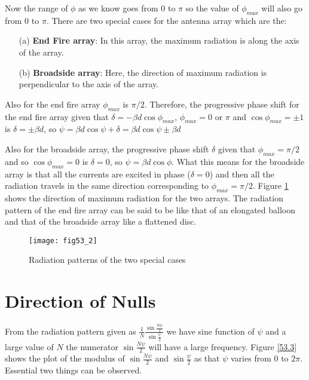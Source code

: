 Now the range of $\phi$ as we know goes from $0$ to $\pi$ so the value of $\phi_{max}$ will also go from $0$ to $\pi$.
There are two special cases for the antenna array which are the:
\begin{enumerate}
	\item [(a)] \textbf{End Fire array}: In this array, the maximum radiation is along the axis of the array. 
	\item[(b)] \textbf{Broadside array}: Here, the direction of maximum radiation is perpendicular to the axis of the array.
\end{enumerate}

Also for the end fire array $\phi_{max}$ is $\pi/2$. Therefore, the progressive phase shift for the end fire array given that $\delta = -\beta d\cos{\phi_{max}}$, $\phi_{max}=0$ or $\pi$ and $\cos{\phi_{max}} = \pm 1$ is $\delta = \pm \beta d$, so $\psi = \beta d \cos{\psi} + \delta = \beta d \cos{\psi} \pm \beta d $

Also for the broadside array, the progressive phase shift $\delta$ given that $\phi_{max} = \pi/2$ and so $\cos\phi_{max} = 0$ is $\delta = 0$, so $\psi = \beta d \cos{\phi}$. What this means for the broadside array is that all the currents are excited in phase ($\delta = 0$) and then all the radiation travels in the same direction corresponding to $\phi_{max} = \pi /2$. Figure \ref{53.2} shows the direction of maximum radiation for the two arrays. The radiation pattern of the end fire array can be said to be like that of an elongated balloon and that of the broadside array like a flattened disc.

\begin{figure}
	\centering
	\texttt{[image: fig53\_2]}
	\caption{Radiation patterns of the two special cases}
	\label{53.2}
	
\end{figure}


\section{Direction of Nulls}
From the radiation pattern given as $\frac{1}{N} \frac{\sin{\frac{N\psi}{2}}}{\sin{\frac{\psi}{2}}} $ we have sine function of $\psi$ and a large value of $N$ the numerator $\sin{\frac{N\psi}{2}} $ will have a large frequency. Figure \ref{53.3} shows the plot of the modulus of $\sin{\frac{N\psi}{2}}$ and $\sin{\frac{\psi}{2}}$ as that $\psi$ varies from $0$ to $2\pi$. Essential two things can be observed. 

